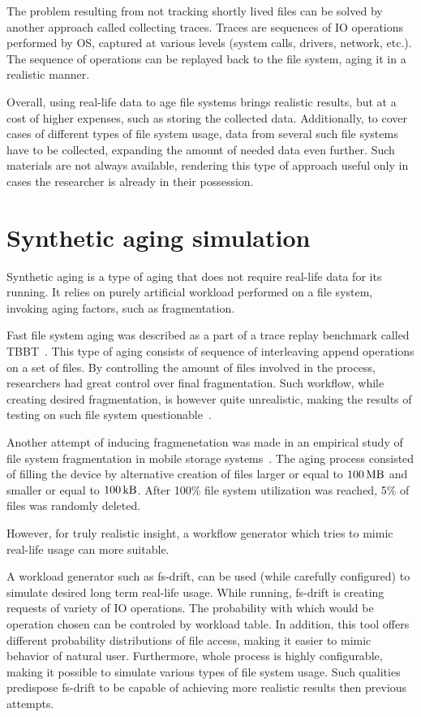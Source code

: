 \documentclass[
  color, %
  table, %
  lof,   %
  lot,   %
]{fithesis3}
\begin{document}
The problem resulting from not tracking shortly lived files can be solved by another approach called collecting traces. Traces are sequences of IO operations performed by OS, captured at various levels (system calls, drivers, network, etc.). The sequence of operations can be replayed back to the file system, aging it in a realistic manner.

Overall, using real-life data to age file systems brings realistic results, but at a cost of higher expenses, such as storing the collected data. Additionally, to cover cases of different types of file system usage, data from several such file systems have to be collected, expanding the amount of needed data even further. Such materials are not always available, rendering this type of approach useful only in cases the researcher is already in their possession.

\section{Synthetic aging simulation}
Synthetic aging is a type of aging that does not require real-life data for its running. It relies on purely artificial workload performed on a file system, invoking aging factors, such as fragmentation.

Fast file system aging was described as a part of a trace replay benchmark called TBBT~\cite{Zhu:2005:TSA:1251028.1251052}. This type of aging consists of sequence of interleaving append operations on a set of files. By controlling the amount of files involved in the process, researchers had great control over final fragmentation. Such workflow, while creating desired fragmentation, is however quite unrealistic, making the results of testing on such file system questionable~\cite{Traeger:2008:NYS:1367829.1367831}.

Another attempt of inducing fragmenetation was made in an empirical study of file system fragmentation in mobile storage systems~\cite{ji2016empirical}. The aging process consisted of filling the device by alternative creation of files larger or equal to $\SI{100}{\mega\byte}$ and smaller or equal to $\SI{100}{\kilo\byte}$. After 100\% file system utilization was reached, 5\% of files was randomly deleted. 

However, for truly realistic insight, a workflow generator which tries to mimic real-life usage can more suitable.

A workload generator such as fs-drift\footnotemark[1], can be used (while carefully configured) to simulate desired long term real-life usage. While running, fs-drift is creating requests of variety of IO operations. The probability with which would be operation chosen can be controled by workload table. In addition, this tool offers different probability distributions of file access, making it easier to mimic behavior of natural user. Furthermore, whole process is highly configurable, making it possible to simulate various types of file system usage. Such qualities predispose fs-drift to be capable of achieving more realistic results then previous attempts.
\end{document}
